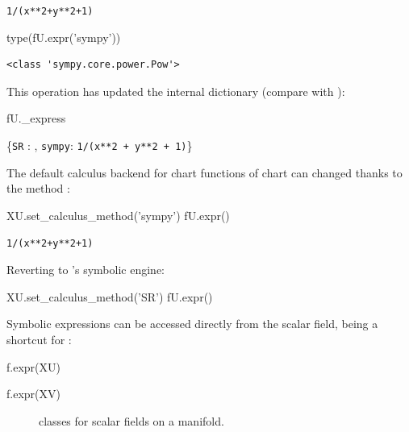 \begin{NBout}
\verb|1/(x**2|\phantom{\verb!x!}\verb|+|\phantom{\verb!x!}\verb|y**2|\phantom{\verb!x!}\verb|+|\phantom{\verb!x!}\verb|1)|
\end{NBout}
\begin{NBin}
type(fU.expr('sympy'))
\end{NBin}
\begin{NBout}
\begin{verbatim}
<class 'sympy.core.power.Pow'>
\end{verbatim}
\end{NBout}
This operation has updated the internal dictionary 
(compare with ):
\begin{NBin}
fU._express
\end{NBin}
\begin{NBoutM}
\left\{\texttt{SR} : ,
\texttt{sympy}: \mbox{\texttt{1/(x**2 + y**2 + 1)}}\right\}
\end{NBoutM}
The default calculus backend for chart functions of chart  can
changed thanks to the method :
\begin{NBin}
XU.set_calculus_method('sympy')
fU.expr()
\end{NBin}
\begin{NBout}
\verb|1/(x**2|\phantom{\verb!x!}\verb|+|\phantom{\verb!x!}\verb|y**2|\phantom{\verb!x!}\verb|+|\phantom{\verb!x!}\verb|1)|
\end{NBout}
Reverting to \Sage{}'s symbolic engine:
\begin{NBin}
XU.set_calculus_method('SR')
fU.expr()
\end{NBin}
\begin{NBoutM}
\end{NBoutM}
Symbolic expressions can be accessed directly from the scalar field,
 being a shortcut for :
\begin{NBin}
f.expr(XU)
\end{NBin}
\begin{NBoutM}
\end{NBoutM}
\begin{NBin}
f.expr(XV)
\end{NBin}
\begin{NBoutM}
\end{NBoutM}

\begin{figure}
\begin{center}

\end{center}
\caption{\label{f:man:scalar_classes}\footnotesize
\Sage{} classes for scalar fields on a manifold.}
\end{figure}

